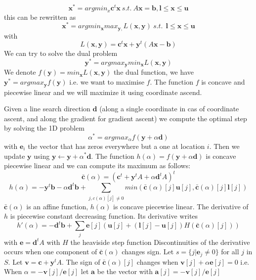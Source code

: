 \documentclass[11pt]{article}
\begin{document}
\begin{equation}
\mathbf{x}^*=argmin_x \mathbf{c}^t\mathbf{x} ~  s.t.~  A\mathbf{x}=\mathbf{b}, \mathbf{l}\leq \mathbf{x}\leq \mathbf{u} 
\end{equation}
this can be rewritten as 
\begin{equation}
\mathbf{x}^*=argmin_\mathbf{x} max_{\mathbf{y},}L(\mathbf{x},\mathbf{y})~  s.t.~ ~ \mathbf{l}\leq \mathbf{x}\leq \mathbf{u} 
\end{equation}
with 
\begin{equation}
L(\mathbf{x},\mathbf{y})=\mathbf{c}^t\mathbf{x}+\mathbf{y}^t(A\mathbf{x}-\mathbf{b})
\end{equation}
We can try to solve the dual problem
\begin{equation}
\mathbf{y}^*=argmax_{\mathbf{y}}min_{\mathbf{x}}L(\mathbf{x},\mathbf{y})
\end{equation}
We denote $f(\mathbf{y})=min_{\mathbf x}L(\mathbf{x},\mathbf{y})$ the dual function, we have $\mathbf{y}^*=argmax_{\mathbf{y}}f(\mathbf{y})$ i.e. we want to maximise $f$. The function $f$ is concave and piecewise linear and we will maximize it using coordinate ascend.

Given a line search direction $\mathbf{d}$ (along a single coordinate in cas of coordinate ascent, and along the gradient for gradient ascent) we compute the optimal step by solving the 1D problem
\begin{equation}
\alpha^*=argmax_\alpha f(\mathbf{y}+\alpha \mathbf{d})
\end{equation}
with $\mathbf{e}_i$ the vector that has zeros everywhere but a one at location $i$.
Then we update $\mathbf{y}$ using $\mathbf{y}\leftarrow \mathbf{y}+\alpha^* \mathbf{d}$. 
The function $h(\alpha)=f(\mathbf{y}+\alpha \mathbf{d})$ is concave piecewise linear
and we can compute its maximum as follows:
\begin{equation}
\bar{\mathbf{c}}(\alpha)=(\mathbf{c}^t+\mathbf{y}^tA+\alpha \mathbf{d}^tA)^t
\end{equation}
\begin{equation}
h(\alpha)=-\mathbf{y}^t\mathbf{b}-\alpha \mathbf{d}^t\mathbf{b}+\sum_{j,\bar{c(\alpha)[j]\neq 0}} min(\bar{\mathbf{c}}(\alpha)[j]\mathbf{u}[j],\bar{\mathbf{c}}(\alpha)[j]\mathbf{l}[j])
\end{equation}
$\bar{\mathbf{c}}(\alpha)$ is an affine function,
$h(\alpha)$ is concave  piecewise linear. The derivative of $h$ is piecewise constant decreasing function. Its derivative writes
\begin{equation}
h'(\alpha)=-\mathbf{d}^t\mathbf{b}+ \sum_j \mathbf{e}[j](\mathbf{u}[j]+(\mathbf{l}[j]-\mathbf{u}[j])H(\mathbf{\bar{c}}(\alpha)[j]))
\end{equation} 
with $\mathbf{e}=\mathbf{d}^tA$
with $H$ the heaviside step function
Discontinuities of the derivative occurs when one component of $\bar{\mathbf{c}}(\alpha)$  changes sign. 
Let $s=\{j|\mathbf{e}_{j}\neq 0\}$ 
for all $j$ in $S$. Let $\mathbf{v}=\mathbf{c}+\mathbf{y}^tA$.
The sign of 
 $\bar{\mathbf{c}}(\alpha)[j]$ changes  when 
$ \mathbf{v}[j]+\alpha\mathbf{e}[j]=0$ i.e. When
$\alpha= -\mathbf{v}[j]/ \mathbf{e}[j]$ 
 let $\mathbf{a}$ be the vector with $\mathbf a[j]=-\mathbf{v}[j]/ \mathbf{e}[j]$
\end{document}
